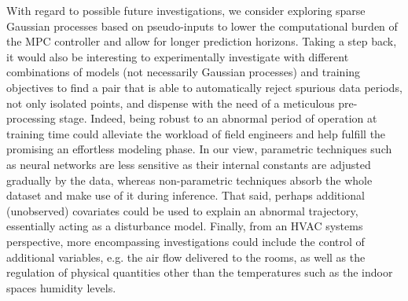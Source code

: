 With regard to possible future investigations, we consider exploring sparse Gaussian processes based on pseudo-inputs \citep{bauer2016understanding} to lower the computational burden of the MPC controller and allow for longer prediction horizons. Taking a step back, it would also be interesting to experimentally investigate with different combinations of models (not necessarily Gaussian processes) and training objectives to find a pair that is able to automatically reject spurious data periods, not only isolated points, and dispense with the need of a meticulous pre-processing stage. Indeed, being robust to an abnormal period of operation at training time could alleviate the workload of field engineers and help fulfill the promising an effortless modeling phase. In our view, parametric techniques such as neural networks are less sensitive as their internal constants are adjusted gradually by the data, whereas non-parametric techniques absorb the whole dataset and make use of it during inference. That said, perhaps additional (unobserved) covariates could be used to explain an abnormal trajectory, essentially acting as a disturbance model. Finally, from an HVAC systems perspective, more encompassing investigations could include the control of additional variables, e.g. the air flow delivered to the rooms, as well as the regulation of physical quantities other than the temperatures such as the indoor spaces humidity levels.





